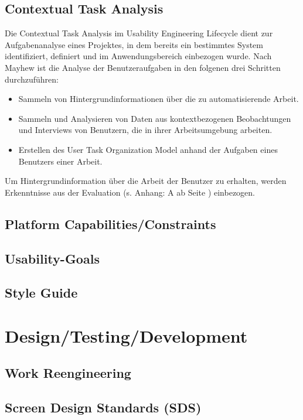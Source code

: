 \documentclass[a4paper,11pt]{article}%
\renewcommand{\\}{\vspace*{0.5\baselineskip} \newline}
\begin{document}
\subsection{Contextual Task Analysis}
	Die Contextual Task Analysis im Usability Engineering Lifecycle dient zur Aufgabenanalyse eines Projektes, in dem bereits ein bestimmtes System identifiziert, definiert und im Anwendungsbereich einbezogen wurde. Nach Mayhew \cite{MD} ist die Analyse der Benutzeraufgaben in den folgenen drei Schritten durchzuführen:
	\begin{itemize}
		\item Sammeln von Hintergrundinformationen über die zu automatisierende Arbeit.
		\item Sammeln und Analysieren von Daten aus kontextbezogenen Beobachtungen und Interviews von Benutzern, die in ihrer Arbeitsumgebung arbeiten.
		\item Erstellen des User Task Organization Model anhand der Aufgaben eines Benutzers einer Arbeit.
	\end{itemize}
	Um Hintergrundinformation über die Arbeit der Benutzer zu erhalten, werden Erkenntnisse aus der Evaluation (s. Anhang: A  ab Seite \pageref{section:Evaluation}) einbezogen.
	
\subsection{Platform Capabilities/Constraints}

\subsection{Usability-Goals}

\subsection{Style Guide}

\newpage

\section{Design/Testing/Development}

\subsection{Work Reengineering}

\subsection{Screen Design Standards (SDS)}
\end{document}
